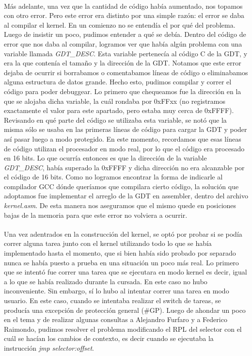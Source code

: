 \documentclass[11pt, a4paper]{article}
\begin{document}
\paragraph{}
Más adelante, una vez que la cantidad de código había aumentado, nos topamos con otro error. Pero este error era distinto por una simple razón: el error se daba al compilar el kernel. En un comienzo no se entendía el por qué del problema. Luego de insistir un poco, pudimos entender a qué se debía. Dentro del código de error que nos daba al compilar, logramos ver que había algún problema con una variable llamada \textit{GDT\_DESC}. Esta variable pertenecía al código C de la GDT, y era la que contenía el tamaño y la dirección de la GDT. Notamos que este error dejaba de ocurrir si borrabamos o comentabamos líneas de código o eliminabamos alguna estructura de datos grande. Hecho esto, pudimos compilar y correr el código para poder debuggear. Lo primero que chequeamos fue la dirección en la que se alojaba dicha variable, la cuál rondaba por 0xFFxx (no registramos exactamente el valor para este apartado, pero estaba muy cerca de 0xFFFF). Revisando en qué parte del código se utilizaba esta variable, se notó que la misma sólo se usaba en las primeras líneas de código para cargar la GDT y poder así pasar luego a modo protegido. En este momento, recordamos que esas líneas de código utilizan el procesador en modo real, por lo que el código era procesado en 16 bits. Lo que ocurría entonces es que la dirección de la variable \textit{GDT\_DESC}, había superado la 0xFFFF y dicha dirección no era alcanzable por el código de 16 bits. Como no logramos encontrar la forma de indicarle al compilador GCC dónde queríamos que compilara cierto código, la solución que adoptamos fue implementar el arreglo de la GDT en assembler, dentro del archivo \textit{kernel.asm}. De esta manera nos aseguramos que el mismo quede en posiciones bajas de la memoria para que este error no volviera a ocurrir.

\paragraph{}
Una vez adentrados en la construcción del kernel, se optó por probar si se podía correr alguna tarea junto con el kernel utilizando todo lo que se había implementado hasta el momento, que si bien había sido probado por separado nunca se había puesto a prueba en una situación un poco más real. Lo primero que se intentó fue correr una tarea que se ejecutara en modo kernel es decir, igual a lo que se había realizado durante la cursada. En este caso no hubo inconveniente. Sin embargo, sí lo hubo al intentar correr una tarea en modo usuario. En este caso, cuando se intentaba realizar el switch de tareas, se producía una excepción de protección general (\#GP). Luego de ahondar un poco en el tema y de realizar algunas consultas a Alejandro Furfaro y a Federico Raimondo, pudimos resolver el problema modificando el RPL del selector con el cuál se hacían los cambios de contexto, es decir cuando se ejecutaba la instrucción \textit{jmp selector:offset}.
\end{document}
